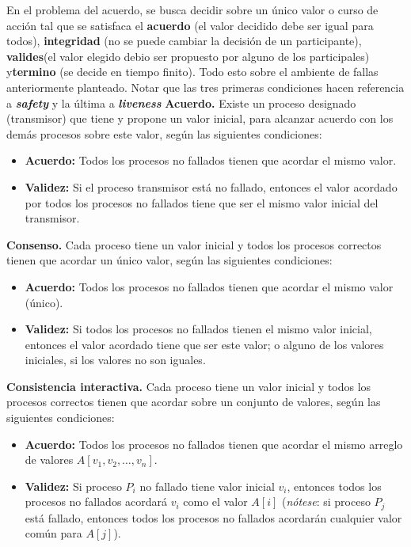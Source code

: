 En el problema del acuerdo, se busca decidir sobre un único valor o curso de acción tal que se satisfaca el \textbf{acuerdo} (el valor decidido debe ser igual para todos), \textbf{integridad} (no se puede cambiar la decisión de un participante), \textbf{valides}(el valor elegido debio ser propuesto por alguno de los participales) y\textbf{termino} (se decide en tiempo finito). Todo esto sobre el ambiente de fallas anteriormente planteado. Notar que las tres primeras condiciones hacen referencia a \textbf{\textit{safety}} y la última a \textbf{\textit{liveness}}
\textbf{Acuerdo.} Existe un proceso designado (transmisor) que tiene y propone un valor inicial, para alcanzar acuerdo con los demás procesos sobre este valor, según las siguientes condiciones:
\begin{itemize}
    \item \textbf{Acuerdo:} Todos los procesos no fallados tienen que acordar el mismo valor.
    \item \textbf{Validez:} Si el proceso transmisor está no fallado, entonces el valor acordado por todos los procesos no fallados tiene que ser el mismo valor inicial del transmisor.
\end{itemize}

\textbf{Consenso.} Cada proceso tiene un valor inicial y todos los procesos correctos tienen que acordar un único valor, según las siguientes condiciones:
\begin{itemize}
    \item \textbf{Acuerdo:} Todos los procesos no fallados tienen que acordar el mismo valor (único).
    \item \textbf{Validez:} Si todos los procesos no fallados tienen el mismo valor inicial, entonces el valor acordado tiene que ser este valor; o alguno de los valores iniciales, si los valores no son iguales.
\end{itemize}

\textbf{Consistencia interactiva.} Cada proceso tiene un valor inicial y todos los procesos correctos tienen que acordar sobre un conjunto de valores, según las siguientes condiciones:
\begin{itemize}
    \item \textbf{Acuerdo:} Todos los procesos no fallados tienen que acordar el mismo arreglo de valores $A[v_1, v_2, \dots, v_n]$.
    \item \textbf{Validez:} Si proceso $P_i$ no fallado tiene valor inicial $v_i$, entonces todos los procesos no fallados acordará $v_i$ como el valor $A[i]$ (\textit{nótese}: si proceso $P_j$ está fallado, entonces todos los procesos no fallados acordarán cualquier valor común para $A[j]$).
\end{itemize}

